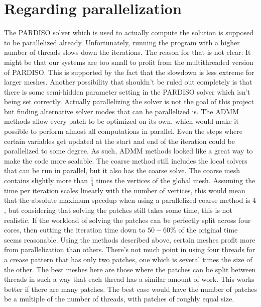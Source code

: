 \documentclass[a4paper,twoside,12pt,nochapterprefix]{scrbook}
\begin{document}
\chapter{Regarding parallelization}\label{sec:parallelization}
The PARDISO solver which is used to actually compute the solution is supposed to be parallelized already. Unfortunately, running the program with a higher number of threads slows down the iterations. The reason for that is not clear: It might be that our systems are too small to profit from the multithreaded version of PARDISO. This is supported by the fact that the slowdown is less extreme for larger meshes. %
Another possibility that shouldn't be ruled out completely is that there is some semi-hidden parameter setting in the PARDISO solver which isn't being set correctly.\newline
Actually parallelizing the solver is not the goal of this project but finding alternative solver modes that can be parallelized is. The ADMM methods allow every patch to be optimized on its own, which would make it possible to perform almost all computations in parallel. Even the steps where certain variables get updated at the start and end of the iteration could be parallelized to some degree. As such, ADMM methods looked like a great way to make the code more scalable.\newline
The coarse method still includes the local solvers that can be run in parallel, but it also has the coarse solve. The coarse mesh contains slightly more than $\frac{1}{4}$ times the vertices of the global mesh. Assuming the time per iteration scales linearly with the number of vertices, this would mean that the absolute maximum speedup when using a parallelized coarse method is $4$, but considering that solving the patches still takes some time, this is not realistic. If the workload of solving the patches can be perfectly split across four cores, then cutting the iteration time down to $50 - 60 \%$ of the original time seems reasonable.\newline
Using the methods described above, certain meshes profit more from parallelization than others. %
There's not much point in using four threads for a crease pattern that has only two patches, one which is several times the size of the other. The best meshes here are those where the patches can be split between threads in such a way that each thread has a similar amount of work. This works better if there are many patches. The best case would have the number of patches be a multiple of the number of threads, with patches of roughly equal size.\newline
\end{document}
